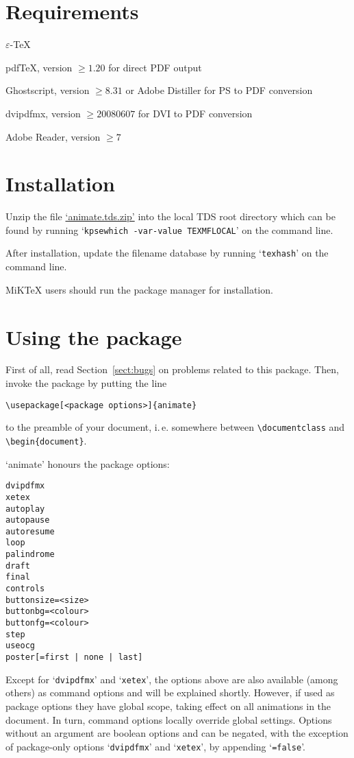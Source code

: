 \documentclass[a4paper]{article}
\begin{document}
\section{Requirements}
\begin{trivlist}
\item $\varepsilon$-\TeX
\item pdf\TeX{}, version $\ge1.20$ for direct PDF output
\item Ghostscript, version $\ge8.31$ or Adobe Distiller for PS to PDF conversion
\item dvipdfmx, version $\ge20080607$ for DVI to PDF conversion
\item Adobe Reader, version $\ge7$
\end{trivlist}

\section{Installation}
Unzip the file \href{http://tug.ctan.org/tex-archive/install/macros/latex/contrib/animate.tds.zip}{`animate.tds.zip'} into the local TDS root directory which can be found by running `\verb+kpsewhich -var-value TEXMFLOCAL+' on the command line.

After installation, update the filename database by running `\verb+texhash+' on the command line.

MiK\TeX{} users should run the package manager for installation.

\section{Using the package}
First of all, read Section~\ref{sect:bugs} on problems related to this package. Then, invoke the package by putting the line
\begin{verbatim}
\usepackage[<package options>]{animate}
\end{verbatim}
to the preamble of your document, i.\,e. somewhere between \verb+\documentclass+ and \verb+\begin{document}+.

`animate' honours the package options:
\begin{verbatim}
dvipdfmx
xetex
autoplay
autopause
autoresume
loop
palindrome
draft
final
controls
buttonsize=<size>
buttonbg=<colour>
buttonfg=<colour>
step
useocg
poster[=first | none | last]
\end{verbatim}
Except for `\verb+dvipdfmx+' and `\verb+xetex+', the options above are also available (among others) as command options and will be explained shortly. However, if used as package options they have global scope, taking effect on all animations in the document. In turn, command options locally override global settings. Options without an argument are boolean options and can be negated, with the exception of package-only options `\verb+dvipdfmx+' and `\verb+xetex+', by appending `\verb+=false+'.
\end{document}
